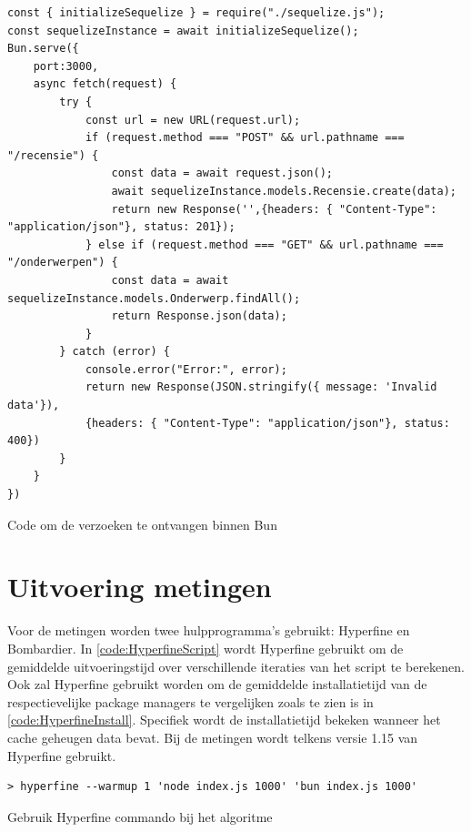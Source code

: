 \begin{listing}[H]
  \centering
  \begin{verbatim}
const { initializeSequelize } = require("./sequelize.js");
const sequelizeInstance = await initializeSequelize();
Bun.serve({
    port:3000,
    async fetch(request) {
        try {
            const url = new URL(request.url);
            if (request.method === "POST" && url.pathname === "/recensie") {
                const data = await request.json();
                await sequelizeInstance.models.Recensie.create(data);
                return new Response('',{headers: { "Content-Type": "application/json"}, status: 201});
            } else if (request.method === "GET" && url.pathname === "/onderwerpen") {
                const data = await sequelizeInstance.models.Onderwerp.findAll();
                return Response.json(data);
            }
        } catch (error) {
            console.error("Error:", error);
            return new Response(JSON.stringify({ message: 'Invalid data'}), 
            {headers: { "Content-Type": "application/json"}, status: 400})
        }
    }
})
\end{verbatim}
\caption[Ontvangen van verzoeken in Bun]{\label{code:BunServer}Code om de verzoeken te ontvangen binnen Bun}
\end{listing}
\section{Uitvoering metingen}
Voor de metingen worden twee hulpprogramma's gebruikt: Hyperfine en Bombardier.
In \ref{code:HyperfineScript} wordt Hyperfine gebruikt om de gemiddelde uitvoeringstijd over verschillende iteraties van het script te berekenen.
Ook zal Hyperfine gebruikt worden om de gemiddelde installatietijd van de respectievelijke package managers te vergelijken zoals 
te zien is in \ref{code:HyperfineInstall}. Specifiek wordt de installatietijd bekeken wanneer het cache geheugen data bevat.
Bij de metingen wordt telkens versie 1.15 van Hyperfine gebruikt.
\begin{listing}[H]
  \centering
  \begin{verbatim}
> hyperfine --warmup 1 'node index.js 1000' 'bun index.js 1000'
      \end{verbatim}
      \caption[Gebruik Hyperfine bij het algoritme]{\label{code:HyperfineScript}Gebruik Hyperfine commando bij het algoritme}
\end{listing}

